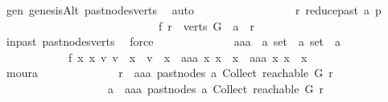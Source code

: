 \begin{isabellebody}
\ gen\ genesisAlt\ past{\isacharunderscore}{\kern0pt}nodes{\isacharunderscore}{\kern0pt}verts\ \isamarkupfalse%
\ auto\ \ \isanewline
\ \ \ \ \ \ \ \ \ \ \ \ \isamarkupfalse%
\ \isamarkupfalse%
\ {\isachardoublequoteopen}r\ {\isasymrightarrow}\isactrlsup {\isacharasterisk}{\kern0pt}\isactrlbsub reduce{\isacharunderscore}{\kern0pt}past\ a\isactrlesub \ p{\isachardoublequoteclose}\isanewline
\ \ \ \ \ \ \ \ \ \ \ \ \isamarkupfalse%
\ {\isacharminus}{\kern0pt}\isanewline
\ \ \ \ \ \ \ \ \ \ \ \ \isamarkupfalse%
\ f{}{\isacharcolon}{\kern0pt}\ {\isachardoublequoteopen}r\ {\isasymin}\ verts\ G\ {\isasymand}\ a\ {\isasymrightarrow}\isactrlsup {\isacharplus}{\kern0pt}\ r{\isachardoublequoteclose}\isanewline
\ \ \ \ \ \ \ \ \ \ \ \ \isamarkupfalse%
\ in{\isacharunderscore}{\kern0pt}past\ past{\isacharunderscore}{\kern0pt}nodes{\isacharunderscore}{\kern0pt}verts\ \isamarkupfalse%
\ force\isanewline
\ \ \ \ \ \ \ \ \ \ \ \ \isamarkupfalse%
\ aaa\ {\isacharcolon}{\kern0pt}{\isacharcolon}{\kern0pt}\ {\isachardoublequoteopen}{\isacharprime}{\kern0pt}a\ set\ {\isasymRightarrow}\ {\isacharprime}{\kern0pt}a\ set\ {\isasymRightarrow}\ {\isacharprime}{\kern0pt}a{\isachardoublequoteclose}\ \isanewline
\ \ \ \ \ \ \ \ \ \ \ \ f{}{\isacharcolon}{\kern0pt}\ {\isachardoublequoteopen}{\isasymforall}x{}\ x{}{\isachardot}{\kern0pt}\ {\isacharparenleft}{\kern0pt}{\isasymexists}v{}{\isachardot}{\kern0pt}\ v{}\ {\isasymin}\ x{}\ {\isasymand}\ v{}\ {\isasymnotin}\ x{}{\isacharparenright}{\kern0pt}\ {\isacharequal}{\kern0pt}\ {\isacharparenleft}{\kern0pt}aaa\ x{}\ x{}\ {\isasymin}\ x{}\ {\isasymand}\ aaa\ x{}\ x{}\ {\isasymnotin}\ x{}{\isacharparenright}{\kern0pt}{\isachardoublequoteclose}\isanewline
\ \ \ \ \ \ \ \ \ \ \ \ \ \ \isamarkupfalse%
\ moura\isanewline
\ \ \ \ \ \ \ \ \ \ \ \ \isamarkupfalse%
\ {\isachardoublequoteopen}r\ {\isasymrightarrow}\isactrlsup {\isacharasterisk}{\kern0pt}\ aaa\ {\isacharparenleft}{\kern0pt}past{\isacharunderscore}{\kern0pt}nodes\ a{\isacharparenright}{\kern0pt}\ {\isacharparenleft}{\kern0pt}Collect\ {\isacharparenleft}{\kern0pt}reachable\ G\ r{\isacharparenright}{\kern0pt}{\isacharparenright}{\kern0pt}\isanewline
\ \ \ \ \ \ \ \ \ \ \ \ \ \ \ \ \ \ {\isasymlongrightarrow}\ a\ {\isasymrightarrow}\isactrlsup {\isacharplus}{\kern0pt}\ aaa\ {\isacharparenleft}{\kern0pt}past{\isacharunderscore}{\kern0pt}nodes\ a{\isacharparenright}{\kern0pt}\ {\isacharparenleft}{\kern0pt}Collect\ {\isacharparenleft}{\kern0pt}reachable\ G\ r{\isacharparenright}{\kern0pt}{\isacharparenright}{\kern0pt}{\isachardoublequoteclose}\isanewline

\end{isabellebody}
